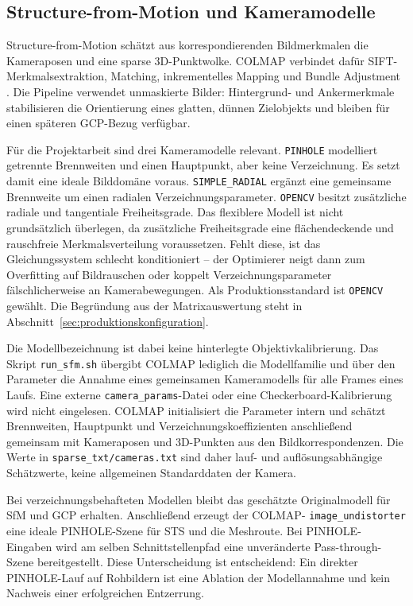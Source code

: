 \subsection{Structure-from-Motion und Kameramodelle}

Structure-from-Motion schätzt aus korrespondierenden Bildmerkmalen die
Kameraposen und eine sparse 3D-Punktwolke. COLMAP verbindet dafür
SIFT-Merkmalsextraktion, Matching, inkrementelles Mapping und Bundle Adjustment
\parencite{schoenberger2016sfm}. Die Pipeline verwendet unmaskierte Bilder:
Hintergrund- und Ankermerkmale stabilisieren die Orientierung eines glatten,
dünnen Zielobjekts und bleiben für einen späteren GCP-Bezug verfügbar.

Für die Projektarbeit sind drei Kameramodelle relevant. \texttt{PINHOLE}
modelliert getrennte Brennweiten und einen Hauptpunkt, aber keine Verzeichnung. Es setzt damit eine
ideale Bilddomäne voraus. \texttt{SIMPLE\_RADIAL} ergänzt eine gemeinsame
Brennweite um einen radialen Verzeichnungsparameter. \texttt{OPENCV} besitzt
zusätzliche radiale und tangentiale Freiheitsgrade. Das flexiblere Modell ist
nicht grundsätzlich überlegen, da zusätzliche Freiheitsgrade eine
flächendeckende und rauschfreie Merkmalsverteilung voraussetzen. Fehlt diese,
ist das Gleichungssystem schlecht konditioniert – der Optimierer neigt dann
zum Overfitting auf Bildrauschen oder koppelt Verzeichnungsparameter
fälschlicherweise an Kamerabewegungen. Als Produktionsstandard
ist \texttt{OPENCV} gewählt. Die Begründung aus der Matrixauswertung steht in
Abschnitt~\ref{sec:produktionskonfiguration}.

Die Modellbezeichnung ist dabei keine hinterlegte Objektivkalibrierung. Das
Skript \texttt{run\_sfm.sh} übergibt COLMAP lediglich die Modellfamilie und über
den Parameter  die Annahme eines gemeinsamen
Kameramodells für alle Frames eines Laufs. Eine externe
\texttt{camera\_params}-Datei oder eine Checkerboard-Kalibrierung wird nicht
eingelesen. COLMAP initialisiert die Parameter intern und schätzt Brennweiten,
Hauptpunkt und Verzeichnungskoeffizienten anschließend gemeinsam mit
Kameraposen und 3D-Punkten aus den Bildkorrespondenzen. Die Werte in
\texttt{sparse\_txt/cameras.txt} sind daher lauf- und auflösungsabhängige
Schätzwerte, keine allgemeinen Standarddaten der Kamera.

Bei verzeichnungsbehafteten Modellen bleibt das geschätzte Originalmodell für
SfM und GCP erhalten. Anschließend erzeugt der COLMAP-
\texttt{image\_undistorter} eine ideale PINHOLE-Szene für STS und die
Meshroute. Bei PINHOLE-Eingaben wird am selben Schnittstellenpfad eine
unveränderte Pass-through-Szene bereitgestellt. Diese Unterscheidung ist
entscheidend: Ein direkter PINHOLE-Lauf auf Rohbildern ist eine Ablation der
Modellannahme und kein Nachweis einer erfolgreichen Entzerrung.

